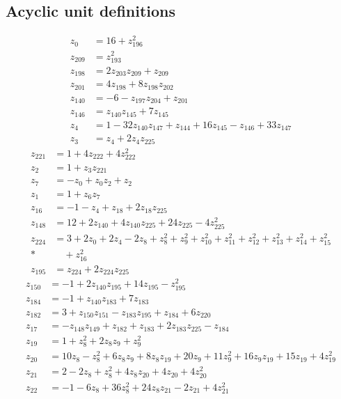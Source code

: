 \documentclass[11pt]{article}
\theoremstyle{remark}
\begin{document}
\subsection*{Acyclic unit definitions}
\begin{align*}
z_{0}&=16+z_{196}^{2}\\[3pt]
z_{209}&=z_{193}^{2}\\[3pt]
z_{198}&=2z_{203} z_{209}+z_{209}\\[3pt]
z_{201}&=4z_{198}+8z_{198} z_{202}\\[3pt]
z_{140}&=-6-z_{197} z_{204}+z_{201}\\[3pt]
z_{146}&=z_{140} z_{145}+7z_{145}\\[3pt]
z_{4}&=1-32z_{140} z_{147}+z_{144}+16z_{145}-z_{146}+33z_{147}\\[3pt]
z_{3}&=z_{4}+2z_{4} z_{225}
\end{align*}
\begin{align*}
z_{221}&=1+4z_{222}+4z_{222}^{2}\\[3pt]
z_{2}&=1+z_{3} z_{221}\\[3pt]
z_{7}&=-z_{0}+z_{0} z_{2}+z_{2}\\[3pt]
z_{1}&=1+z_{6} z_{7}\\[3pt]
z_{16}&=-1-z_{4}+z_{18}+2z_{18} z_{225}\\[3pt]
z_{148}&=12+2z_{140}+4z_{140} z_{225}+24z_{225}-4z_{225}^{2}\\[3pt]
z_{224}&=3+2z_{0}+2z_{4}-2z_{8}+z_{8}^{2}+z_{9}^{2}+z_{10}^{2}+z_{11}^{2}+z_{12}^{2}+z_{13}^{2}+z_{14}^{2}+z_{15}^{2}\\*
&\quad{}+z_{16}^{2}\\[3pt]
z_{195}&=z_{224}+2z_{224} z_{225}
\end{align*}
\begin{align*}
z_{150}&=-1+2z_{140} z_{195}+14z_{195}-z_{195}^{2}\\[3pt]
z_{184}&=-1+z_{140} z_{183}+7z_{183}\\[3pt]
z_{182}&=3+z_{150} z_{151}-z_{183} z_{195}+z_{184}+6z_{220}\\[3pt]
z_{17}&=-z_{148} z_{149}+z_{182}+z_{183}+2z_{183} z_{225}-z_{184}\\[3pt]
z_{19}&=1+z_{8}^{2}+2z_{8} z_{9}+z_{9}^{2}\\[3pt]
z_{20}&=10z_{8}-z_{8}^{2}+6z_{8} z_{9}+8z_{8} z_{19}+20z_{9}+11z_{9}^{2}+16z_{9} z_{19}+15z_{19}+4z_{19}^{2}\\[3pt]
z_{21}&=2-2z_{8}+z_{8}^{2}+4z_{8} z_{20}+4z_{20}+4z_{20}^{2}\\[3pt]
z_{22}&=-1-6z_{8}+36z_{8}^{2}+24z_{8} z_{21}-2z_{21}+4z_{21}^{2}
\end{align*}
\end{document}
